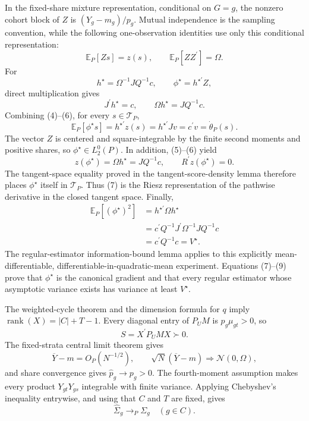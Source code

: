 In the fixed-share mixture representation, conditional on \(G=g\), the nonzero cohort block of \(Z\) is \((Y_g-m_g)/p_g\).  Mutual independence is the sampling convention, while the following one-observation identities use only this conditional representation:
\[
\mathbb E_P[Zs]=z(s),
\qquad
\mathbb E_P[ZZ^{\prime}]=\Omega.                                      \tag{5}
\]
For
\[
h^{\star}=\Omega^{-1}JQ^{-1}c,
\qquad
\phi^{\star}=h^{\star\prime}Z,
\]
direct multiplication gives
\[
J^{\prime}h^{\star}=c,
\qquad
\Omega h^{\star}=JQ^{-1}c.                                            \tag{6}
\]
Combining (4)--(6), for every \(s\in\mathcal T_P\),
\[
\mathbb E_P[\phi^{\star}s]
=h^{\star\prime}z(s)
=h^{\star\prime}Jv
=c^{\prime}v
=\dot\theta_P(s).                                                       \tag{7}
\]
The vector \(Z\) is centered and square-integrable by the finite second moments and positive shares, so \(\phi^{\star}\in L_2^0(P)\).  In addition, (5)--(6) yield
\[
z(\phi^{\star})=\Omega h^{\star}=JQ^{-1}c,
\qquad
R^{\prime}z(\phi^{\star})=0.                                         \tag{8}
\]
The tangent-space equality proved in the tangent-score-density lemma therefore places \(\phi^{\star}\) itself in \(\mathcal T_P\).  Thus (7) is the Riesz representation of the pathwise derivative in the closed tangent space.  Finally,
\[
\begin{aligned}
\mathbb E_P[(\phi^{\star})^2]
&=h^{\star\prime}\Omega h^{\star}\\
&=c^{\prime}Q^{-1}J^{\prime}\Omega^{-1}JQ^{-1}c\\
&=c^{\prime}Q^{-1}c
=V^{\star}.                                                            \tag{9}
\end{aligned}
\]
The regular-estimator information-bound lemma applies to this explicitly mean-differentiable, differentiable-in-quadratic-mean experiment.  Equations (7)--(9) prove that \(\phi^{\star}\) is the canonical gradient and that every regular estimator whose asymptotic variance exists has variance at least \(V^{\star}\).

The weighted-cycle theorem and the dimension formula for \(q\) imply
\(\operatorname{rank}(X)=|C|+T-1\).  Every diagonal entry of \(P_UM\) is \(p_g\mu_{gt}>0\), so
\[
S=X^{\prime}P_UMX\succ0.                                                \tag{1}
\]
The fixed-strata central limit theorem gives
\[
\overline Y-m=O_P(N^{-1/2}),
\qquad
\sqrt N(\overline Y-m)\Rightarrow\mathcal N(0,\Omega),                 \tag{2}
\]
and share convergence gives \(\widehat p_g\to p_g>0\).  The fourth-moment assumption makes every product \(Y_{gt}Y_{gs}\) integrable with finite variance.  Applying Chebyshev's inequality entrywise, and using that \(C\) and \(T\) are fixed, gives
\[
\widehat\Sigma_g\to_P\Sigma_g\quad(g\in C).                          \tag{3}
\]

